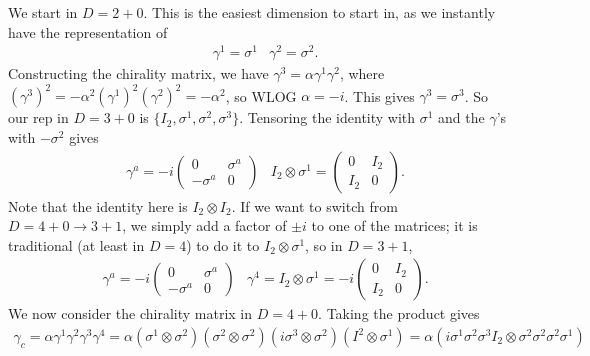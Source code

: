 \documentclass[11pt]{article}
\begin{document}
\begin{eexample}
    [Bootstrapping our way to Heaven ($D = 11$ supergravity)]
    We start in $D = 2 + 0$. This is the easiest dimension to
    start in, as we instantly have the representation of
    \begin{align*}
        & \gamma^1 = \sigma^1 & \gamma^2 = \sigma^2.
    \end{align*}
    Constructing the chirality matrix, we have $\gamma^3 = \alpha \gamma^1 \gamma^2$,
    where $(\gamma^3)^2 = - \alpha^2 (\gamma^1)^2 (\gamma^2)^2 = - \alpha^2$,
    so WLOG $\alpha = -i$. This gives $\gamma^3 = \sigma^3$. So our rep in $D = 3 + 0$
    is $\{ I_2, \sigma^1, \sigma^2, \sigma^3 \}$. Tensoring the identity
    with $\sigma^1$ and the $\gamma$'s with $-\sigma^2$ gives
    \begin{align*}
        & \gamma^a = -i \begin{pmatrix}
            0 & \sigma^a\\
            - \sigma^a & 0
        \end{pmatrix}
        & I_2 \otimes \sigma^1 = \begin{pmatrix}
            0 & I_2\\
            I_2 & 0
        \end{pmatrix}.
    \end{align*}
    Note that the identity here is $I_2 \otimes I_2$. If we want
    to switch from $D = 4 + 0 \to 3 + 1$, we simply add a factor
    of $\pm i$ to one of the matrices; it is traditional (at least
    in $D = 4$) to do it to $I_2 \otimes \sigma^1$, so in $D = 3 + 1$,
    \begin{align*}
        & \gamma^a = -i \begin{pmatrix}
            0 & \sigma^a\\
            - \sigma^a & 0
        \end{pmatrix}
        & \gamma^4 = I_2 \otimes \sigma^1 = -i \begin{pmatrix}
            0 & I_2\\
            I_2 & 0
        \end{pmatrix}.
    \end{align*}
    We now consider the chirality matrix in $D = 4 + 0$.
    Taking the product gives
    \begin{align*}
        \gamma_c = \alpha \gamma^1 \gamma^2 \gamma^3 \gamma^4
        = \alpha (\sigma^{1} \otimes \sigma^{2})(\sigma^{2} \otimes \sigma^{2}) (i\sigma^{3} \otimes \sigma^{2})(I^{2} \otimes \sigma^{1})
        = \alpha (i \sigma^1 \sigma^2 \sigma^3 I_2 \otimes \sigma^2 \sigma^2 \sigma^2 \sigma^1)

\end{align*}
\end{eexample}
\end{document}
